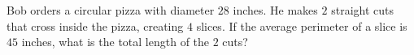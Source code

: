 Bob orders a circular pizza with diameter $28$ inches. He makes $2$ straight cuts that cross inside the pizza, creating $4$ slices. If the average perimeter of a slice is $45$ inches, what is the total length of the $2$ cuts?
